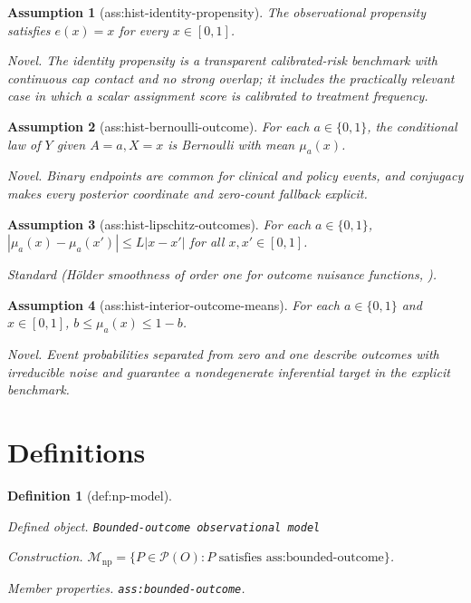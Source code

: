 \documentclass{article}
\newtheorem{assumption}{Assumption}
\newtheorem{definition}{Definition}
\begin{document}
\begin{assumption}[ass:hist-identity-propensity]\label{ass:hist-identity-propensity}
The observational propensity satisfies \(e(x)=x\) for every \(x\in[0,1]\).
\par\smallskip\noindent\emph{Novel.} The identity propensity is a transparent calibrated-risk benchmark with continuous cap contact and no strong overlap; it includes the practically relevant case in which a scalar assignment score is calibrated to treatment frequency.
\end{assumption}

\begin{assumption}[ass:hist-bernoulli-outcome]\label{ass:hist-bernoulli-outcome}
For each \(a\in\{0,1\}\), the conditional law of \(Y\) given \(A=a,X=x\) is Bernoulli with mean \(\mu_a(x)\).
\par\smallskip\noindent\emph{Novel.} Binary endpoints are common for clinical and policy events, and conjugacy makes every posterior coordinate and zero-count fallback explicit.
\end{assumption}

\begin{assumption}[ass:hist-lipschitz-outcomes]\label{ass:hist-lipschitz-outcomes}
For each \(a\in\{0,1\}\), \(|\mu_a(x)-\mu_a(x')|\le L|x-x'|\) for all \(x,x'\in[0,1]\).
\par\smallskip\noindent\emph{Standard} (Hölder smoothness of order one for outcome nuisance functions, \cite{SchmidtWikle2026}).
\end{assumption}

\begin{assumption}[ass:hist-interior-outcome-means]\label{ass:hist-interior-outcome-means}
For each \(a\in\{0,1\}\) and \(x\in[0,1]\), \(b\le\mu_a(x)\le1-b\).
\par\smallskip\noindent\emph{Novel.} Event probabilities separated from zero and one describe outcomes with irreducible noise and guarantee a nondegenerate inferential target in the explicit benchmark.
\end{assumption}

\section{Definitions}

\begin{definition}[def:np-model]\label{def:np-model}
\par\smallskip\noindent\emph{Defined object.} \texttt{Bounded-\allowbreak{}outcome observational model}
\par\smallskip\noindent\emph{Construction.} \(\mathcal M_{\mathrm{np}}=\{P\in\mathcal P(O):P\text{ satisfies }\text{ass:bounded-outcome}\}\).
\par\smallskip\noindent\emph{Member properties.} \texttt{ass:\allowbreak{}bounded-\allowbreak{}outcome}.
\end{definition}
\end{document}

